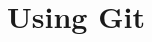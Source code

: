 \documentclass[10pt,compress]{beamer} %
\begin{document}
\section{Using Git}














\end{document}
